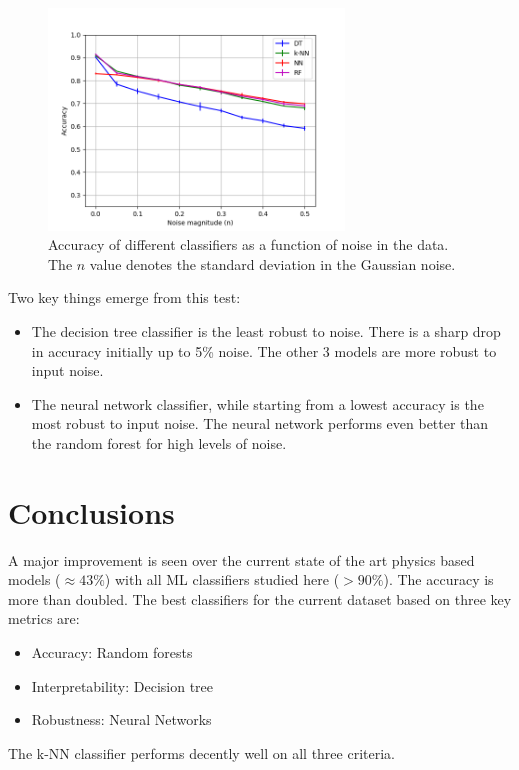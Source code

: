 \documentclass{article}
\begin{document}
\begin{figure}[h]
	\centering
	\includegraphics[width=0.7\textwidth]{../figures/accuracy_with_noise.png}
	\caption{Accuracy of different classifiers as a function of noise in the data. The $n$ value denotes the standard deviation in the Gaussian noise. }
	\label{fig:noise}
\end{figure}

Two key things emerge from this test:
\begin{itemize}
\item The decision tree classifier is the least robust to noise. There is a sharp drop in accuracy initially up to 5\% noise. The other 3 models are more robust to input noise.
\item The neural network classifier, while starting from a lowest accuracy is the most robust to input noise. The neural network performs even better than the random forest for high levels of noise.
\end{itemize}

\section{Conclusions}

A major improvement is seen over the current state of the art physics based models ($\approx 43\%$) with all ML classifiers studied here ($> 90\%$). The accuracy is more than doubled. The best classifiers for the current dataset based on three key metrics are:
\begin{itemize}
\item Accuracy: Random forests
\item Interpretability: Decision tree
\item Robustness: Neural Networks
\end{itemize}
The k-NN classifier performs decently well on all three criteria.
\end{document}
